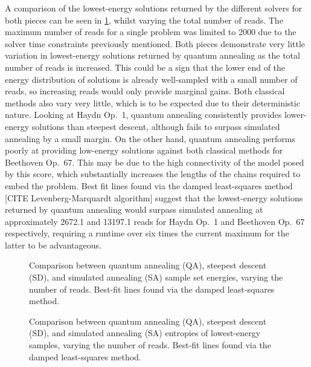 \documentclass[12pt]{article}
\theoremstyle{definition}
\begin{document}
A comparison of the lowest-energy solutions returned by the different solvers for both pieces can be seen in \cref{fig:reads}, whilst varying the total number of reads. The maximum number of reads for a single problem was limited to \num{2000} due to the solver time constraints previously mentioned. Both pieces demonstrate very little variation in lowest-energy solutions returned by quantum annealing as the total number of reads is increased. This could be a sign that the lower end of the energy distribution of solutions is already well-sampled with a small number of reads, so increasing reads would only provide marginal gains. Both classical methods also vary very little, which is to be expected due to their deterministic nature.
Looking at Haydn Op.\ 1, quantum annealing consistently provides lower-energy solutions than steepest descent, although fails to surpass simulated annealing by a small margin. On the other hand, quantum annealing performs poorly at providing low-energy solutions against both classical methods for Beethoven Op.\ 67. This may be due to the high connectivity of the model posed by this score, which substantially increases the lengths of the chains required to embed the problem. Best fit lines found via the damped least-squares method [CITE Levenberg-Marquardt algorithm] suggest that the lowest-energy solutions returned by quantum annealing would surpass simulated annealing at approximately \num{2672.1} and \num{13197.1} reads for Haydn Op.\ 1 and Beethoven Op.\ 67 respectively, requiring a runtime over six times the current maximum for the latter to be advantageous.

\begin{figure}
    \centering\scriptsize
    
    \caption{Comparison between quantum annealing (QA), steepest descent (SD), and simulated annealing (SA) sample set energies, varying the number of reads. Best-fit lines found via the damped least-squares method.}
    \label{fig:reads}
\end{figure}

\begin{figure}
    \centering\scriptsize
    
    \caption{Comparison between quantum annealing (QA), steepest descent (SD), and simulated annealing (SA) entropies of lowest-energy samples, varying the number of reads. Best-fit lines found via the damped least-squares method.}
    \label{fig:entropy}
\end{figure}
\end{document}
